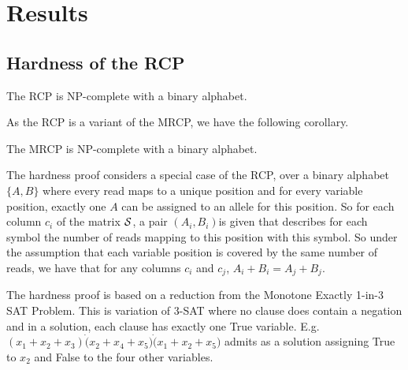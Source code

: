 \documentclass[10pt]{llncs}
\begin{document}
\section{Results}
\label{sec:results}

\subsection{Hardness of the RCP}
\label{ssec:RCPhardness}

\begin{theorem}
    \label{thm:RCPhardness}
    The RCP is NP-complete with a binary alphabet.
\end{theorem}

As the RCP is a variant of the MRCP, we have the following corollary.

\begin{corollary}
    \label{cor:MRCPhardness}
    The MRCP is NP-complete with a binary alphabet.
\end{corollary}

The hardness proof considers a special case of the RCP, over a binary alphabet $\{A,B\}$ where every read maps to a unique position and for every variable position, exactly one $A$ can be assigned to an allele for this position. So for each column $c_i$ of the matrix $\cal S$, a pair $(A_i,B_i)$is given that describes for each symbol the number of reads mapping to this position with this symbol. So under the assumption that each variable position is covered by the same number of reads, we have that for any columns $c_i$ and $c_j$, $A_i+B_i = A_j+B_j$. 

The hardness proof is based on a reduction from the Monotone Exactly 1-in-3 SAT Problem. This is variation of 3-SAT where no clause does contain a negation and in a solution, each clause has exactly one True variable. E.g. $(x_1+x_2+x_3) \dot (x_2+x_4+x_5) \dot (x_1+x_2+x_5)$ admits as a solution assigning True to $x_2$ and False to the four other variables.
\end{document}
